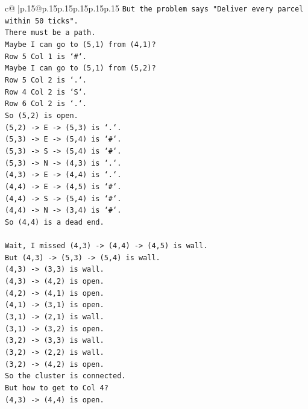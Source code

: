\documentclass{article}
\begin{document}
{\begin{supertabular}{c@{$\;$}|p{.15\linewidth}@{}p{.15\linewidth}p{.15\linewidth}p{.15\linewidth}p{.15\linewidth}p{.15\linewidth}}
{{{\texttt{But the problem says "Deliver every parcel within 50 ticks".} \\
\texttt{There must be a path.} \\
\texttt{Maybe I can go to (5,1) from (4,1)?} \\
\texttt{Row 5 Col 1 is `\#`.} \\
\texttt{Maybe I can go to (5,1) from (5,2)?} \\
\texttt{Row 5 Col 2 is `.`.} \\
\texttt{Row 4 Col 2 is `S`.} \\
\texttt{Row 6 Col 2 is `.`.} \\
\texttt{So (5,2) is open.} \\
\texttt{(5,2) {-}> E {-}> (5,3) is `.`.} \\
\texttt{(5,3) {-}> E {-}> (5,4) is `\#`.} \\
\texttt{(5,3) {-}> S {-}> (5,4) is `\#`.} \\
\texttt{(5,3) {-}> N {-}> (4,3) is `.`.} \\
\texttt{(4,3) {-}> E {-}> (4,4) is `.`.} \\
\texttt{(4,4) {-}> E {-}> (4,5) is `\#`.} \\
\texttt{(4,4) {-}> S {-}> (5,4) is `\#`.} \\
\texttt{(4,4) {-}> N {-}> (3,4) is `\#`.} \\
\texttt{So (4,4) is a dead end.} \\
\\ 
\texttt{Wait, I missed (4,3) {-}> (4,4) {-}> (4,5) is wall.} \\
\texttt{But (4,3) {-}> (5,3) {-}> (5,4) is wall.} \\
\texttt{(4,3) {-}> (3,3) is wall.} \\
\texttt{(4,3) {-}> (4,2) is open.} \\
\texttt{(4,2) {-}> (4,1) is open.} \\
\texttt{(4,1) {-}> (3,1) is open.} \\
\texttt{(3,1) {-}> (2,1) is wall.} \\
\texttt{(3,1) {-}> (3,2) is open.} \\
\texttt{(3,2) {-}> (3,3) is wall.} \\
\texttt{(3,2) {-}> (2,2) is wall.} \\
\texttt{(3,2) {-}> (4,2) is open.} \\
\texttt{So the cluster is connected.} \\
\texttt{But how to get to Col 4?} \\
\texttt{(4,3) {-}> (4,4) is open.} \\
}}}
\end{supertabular}}
\end{document}
